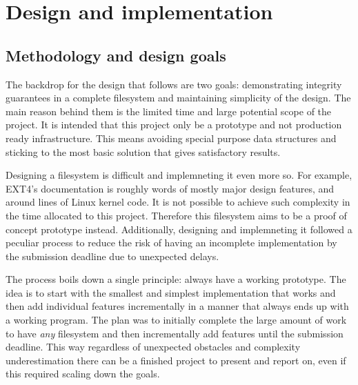 \chapter{Design and implementation}
    \label{sec_design}

    \section{Methodology and design goals}
        \label{sec_methodology}

        The backdrop for the design that follows are two goals: demonstrating
        integrity guarantees in a complete filesystem and maintaining
        simplicity of the design. The main reason behind them is the limited
        time and large potential scope of the project. It is intended that this
        project only be a prototype and not production ready infrastructure.
        This means avoiding special purpose data structures and sticking to the
        most basic solution that gives satisfactory results.

        Designing a filesystem is difficult and implemneting it even more so.
        For example, EXT4's documentation \cite{ext4_docs} is roughly
         words of mostly major design features, and around
         lines of Linux kernel code. It is not possible to
        achieve such complexity in the time allocated to this project.
        Therefore this filesystem aims to be a proof of concept prototype
        instead. Additionally, designing and implemneting it followed a
        peculiar process to reduce the risk of having an incomplete
        implementation by the submission deadline due to unexpected delays.

        The process boils down a single principle: always have a working
        prototype. The idea is to start with the smallest and simplest
        implementation that works and then add individual features
        incrementally in a manner that always ends up with a working program.
        The plan was to initially complete the large amount of work to have
        \textit{any} filesystem and then incrementally add features until the
        submission deadline. This way regardless of unexpected obstacles and
        complexity underestimation there can be a finished project to present
        and report on, even if this required scaling down the goals.



